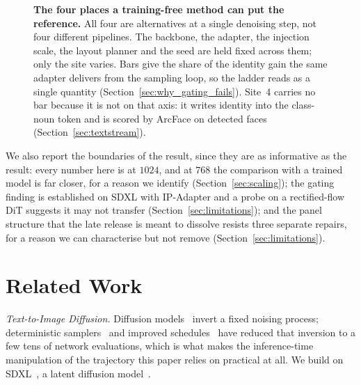 \documentclass[review,10pt,times]{elsarticle}
\begin{document}
\begin{enumerate}
\end{enumerate}

\begin{figure}[H]
  \centering
  \makebox[\linewidth][c]{}
  \caption{%
    \textbf{The four places a training-free method can put the reference.}
    All four are alternatives at a single denoising step, not four different
    pipelines.  The backbone, the adapter, the injection scale, the layout
    planner and the seed are held fixed across them; only the site varies.  Bars
    give the share of the identity gain the same adapter delivers from the
    sampling loop, so the ladder reads as a single quantity
    (Section~\ref{sec:why_gating_fails}).  Site~4 carries no bar because it is
    not on that axis: it writes identity into the class-noun token and is
    scored by ArcFace on detected faces (Section~\ref{sec:textstream}).
  }
  \label{fig:ladder}
\end{figure}

We also report the boundaries of the result, since they are as informative as
the result: every number here is at $1024$, and at $768$ the comparison with
a trained model is far closer, for a reason we identify
(Section~\ref{sec:scaling}); the gating finding is established
on SDXL with IP-Adapter and a probe on a rectified-flow DiT suggests it may
not transfer (Section~\ref{sec:limitations}); and the panel structure that the
late release is meant to dissolve resists three separate repairs, for a reason
we can characterise but not remove (Section~\ref{sec:limitations}).

\section{Related Work}
\label{sec:related}

\noindent\textit{Text-to-Image Diffusion.}
Diffusion models~\cite{ho2020denoising} invert a fixed noising process;
deterministic samplers~\cite{song2021denoising,lu2022dpmsolver} and improved
schedules~\cite{karras2022elucidating} have reduced that inversion to a few
tens of network evaluations, which is what makes the inference-time
manipulation of the trajectory this paper relies on practical at all.  We
build on SDXL~\cite{podell2024sdxl}, a latent diffusion
model~\cite{rombach2022high}.
\end{document}
